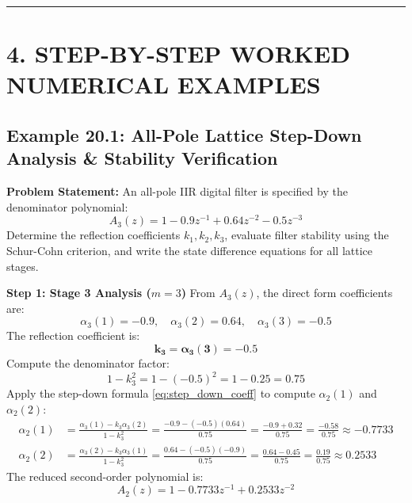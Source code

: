 \documentclass[11pt,a4paper]{article}
\begin{document}
\noindent\rule{\textwidth}{0.5pt}

\section{4. STEP-BY-STEP WORKED NUMERICAL EXAMPLES}

\subsection{Example 20.1: All-Pole Lattice Step-Down Analysis \& Stability Verification}
\textbf{Problem Statement:} An all-pole IIR digital filter is specified by the denominator polynomial:
\begin{equation}
A_3(z) = 1 - 0.9 z^{-1} + 0.64 z^{-2} - 0.5 z^{-3}
\end{equation}
Determine the reflection coefficients $k_1, k_2, k_3$, evaluate filter stability using the Schur-Cohn criterion, and write the state difference equations for all lattice stages.

\vspace{1mm}
\noindent\textbf{Step 1: Stage 3 Analysis ($m = 3$)}
From $A_3(z)$, the direct form coefficients are:
\begin{equation}
\alpha_3(1) = -0.9, \quad \alpha_3(2) = 0.64, \quad \alpha_3(3) = -0.5
\end{equation}
The reflection coefficient is:
\begin{equation}
\mathbf{k_3 = \alpha_3(3) = -0.5}
\end{equation}
Compute the denominator factor:
\begin{equation}
1 - k_3^2 = 1 - (-0.5)^2 = 1 - 0.25 = 0.75
\end{equation}
Apply the step-down formula \eqref{eq:step_down_coeff} to compute $\alpha_2(1)$ and $\alpha_2(2)$:
\begin{align}
\alpha_2(1) &= \frac{\alpha_3(1) - k_3 \alpha_3(2)}{1 - k_3^2} = \frac{-0.9 - (-0.5)(0.64)}{0.75} = \frac{-0.9 + 0.32}{0.75} = \frac{-0.58}{0.75} \approx \mathbf{-0.7733} \\
\alpha_2(2) &= \frac{\alpha_3(2) - k_3 \alpha_3(1)}{1 - k_3^2} = \frac{0.64 - (-0.5)(-0.9)}{0.75} = \frac{0.64 - 0.45}{0.75} = \frac{0.19}{0.75} \approx \mathbf{0.2533}
\end{align}
The reduced second-order polynomial is:
\begin{equation}
A_2(z) = 1 - 0.7733 z^{-1} + 0.2533 z^{-2}
\end{equation}
\end{document}
